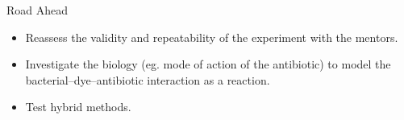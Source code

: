 \documentclass{beamer}
\begin{document}
\begin{frame}{Road Ahead}
    \begin{itemize}
        \item Reassess the validity and repeatability of the experiment with the mentors.
        \item Investigate the biology (eg. mode of action of the antibiotic) to model the bacterial–dye–antibiotic interaction as a reaction.
        \item Test hybrid methods.
    \end{itemize}
\end{frame}
\end{document}

